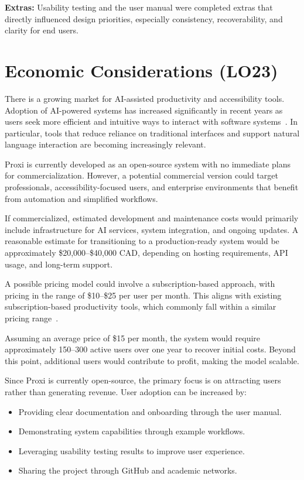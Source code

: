 \documentclass{article}
\begin{document}
\textbf{Extras:} Usability testing and the user manual were completed extras
that directly influenced design priorities, especially consistency, recoverability,
and clarity for end users.

\section{Economic Considerations (LO23)}

There is a growing market for AI-assisted productivity and accessibility
tools. Adoption of AI-powered systems has increased significantly in
recent years as users seek more efficient and intuitive ways to interact
with software systems~\citep{ai_adoption}. In particular, tools that
reduce reliance on traditional interfaces and support natural language
interaction are becoming increasingly relevant.

Proxi is currently developed as an open-source system with no immediate
plans for commercialization. However, a potential commercial version
could target professionals, accessibility-focused users, and enterprise
environments that benefit from automation and simplified workflows.

If commercialized, estimated development and maintenance costs would
primarily include infrastructure for AI services, system integration,
and ongoing updates. A reasonable estimate for transitioning to a
production-ready system would be approximately \$20,000--\$40,000 CAD,
depending on hosting requirements, API usage, and long-term support.

A possible pricing model could involve a subscription-based approach,
with pricing in the range of \$10--\$25 per user per month. This aligns
with existing subscription-based productivity tools, which commonly fall
within a similar pricing range~\citep{pricing}.

Assuming an average price of \$15 per month, the system would require
approximately 150--300 active users over one year to recover initial
costs. Beyond this point, additional users would contribute to profit,
making the model scalable.

Since Proxi is currently open-source, the primary focus is on attracting
users rather than generating revenue. User adoption can be increased by:

\begin{itemize}
\item Providing clear documentation and onboarding through the user manual.
\item Demonstrating system capabilities through example workflows.
\item Leveraging usability testing results to improve user experience.
\item Sharing the project through GitHub and academic networks.
\end{itemize}
\end{document}
